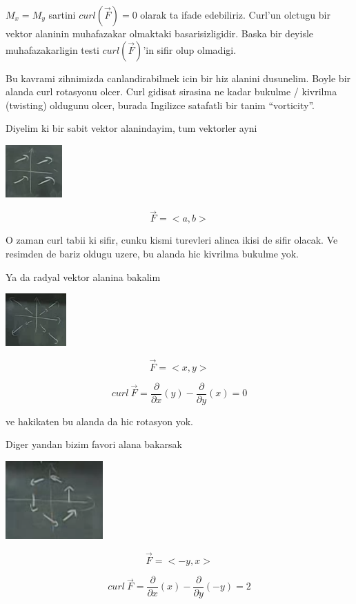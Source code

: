 \documentclass[12pt,fleqn]{article}\usepackage{../common}
\begin{document}
$M_x = M_y$ sartini $curl(\vec{F}) = 0$ olarak ta ifade edebiliriz. Curl'un
olctugu bir vektor alaninin muhafazakar olmaktaki basarisizligidir. Baska
bir deyisle muhafazakarligin testi $curl(\vec{F})$'in sifir olup olmadigi. 

Bu kavrami zihnimizda canlandirabilmek icin bir hiz alanini
dusunelim. Boyle bir alanda curl rotasyonu olcer. Curl gidisat sirasina ne
kadar bukulme /  kivrilma (twisting) oldugunu olcer, burada Ingilizce satafatli bir
tanim ``vorticity''. 

Diyelim ki bir sabit vektor alanindayim, tum vektorler ayni

\includegraphics[height=2cm]{21_5.png}

\[ \vec{F} = <a,b> \]

O zaman curl tabii ki sifir, cunku kismi turevleri alinca ikisi de sifir
olacak. Ve resimden de bariz oldugu uzere, bu alanda hic kivrilma bukulme
yok. 

Ya da radyal vektor alanina bakalim

\includegraphics[height=2cm]{21_6.png}

\[ \vec{F}= <x,y> \]

\[ curl \ \vec{F} = \frac{\partial }{\partial x}(y) -
 \frac{\partial }{\partial y}(x) = 0
 \]

ve hakikaten bu alanda da hic rotasyon yok. 

Diger yandan bizim favori alana bakarsak

\includegraphics[height=3cm]{21_1.png}

\[ \vec{F} = <-y,x> \]

\[ curl \ \vec{F} = \frac{\partial }{\partial x}(x) -
 \frac{\partial }{\partial y}(-y) = 2
 \]
\end{document}
